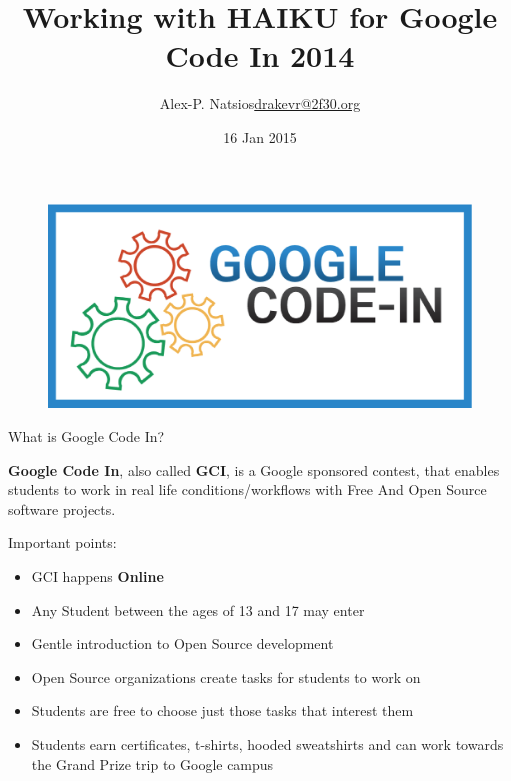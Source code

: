 \documentclass{beamer}
\title{Working with HAIKU for Google Code In 2014}
\author{\texorpdfstring{Alex-P. Natsios\newline\url{drakevr@2f30.org}}{Author}}
\institute{High School of Nikaia, Larissa, Greece}
\date{16 Jan 2015}
\begin{document}
    \begin{frame}
       \titlepage
    \end{frame}

    \begin{frame}{}
        \begin{figure}{}{}
            \includegraphics[scale=0.2]{images/GCI_logo.eps}
        \end{figure}
    \end{frame}

    \begin{frame}{What is Google Code In?}

        {\bf Google Code In}, also called {\bf GCI}, is a Google sponsored contest,
        that enables students to work in real life conditions/workflows with Free
        And Open Source software projects.

        \begin{block}{Important points:}
            \begin{itemize}
                \item GCI happens {\bf Online}
                \item Any Student between the ages of 13 and 17 may enter
                \item Gentle introduction to Open Source development
                \item Open Source organizations create tasks for students to work on
                \item Students are free to choose just those tasks that interest them
                \item Students earn certificates, t-shirts, hooded
                      sweatshirts and can work towards the Grand Prize
                      trip to Google campus
            \end{itemize}
        \end{block}
    \end{frame}
\end{document}
